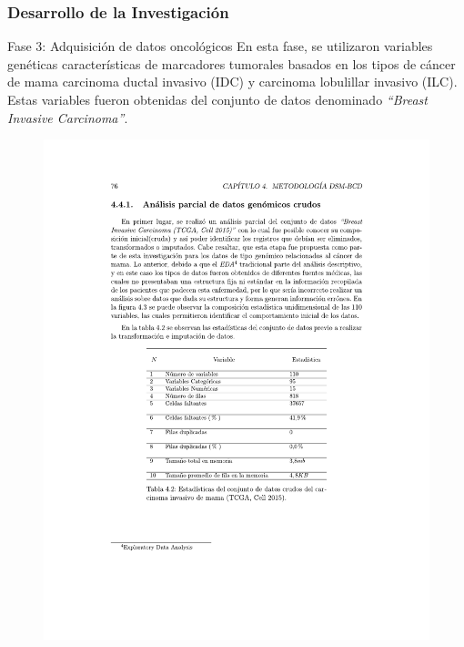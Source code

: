 \documentclass[xcolor=dvipsnames,xcolor=table,10pt]{beamer} %
\begin{document}
\begin{frame}
	\frametitle{Desarrollo de la Investigación}
	\begin{block}{Fase 3: Adquisición de datos oncológicos}\justifying
	En esta fase, se utilizaron variables genéticas características de marcadores tumorales basados en los tipos de cáncer de mama carcinoma ductal invasivo (IDC) y carcinoma lobulillar invasivo (ILC). Estas variables fueron obtenidas del conjunto de datos denominado \textit{“Breast Invasive Carcinoma”}.
	\end{block}
	
	\begin{figure}[h!]
		\centering
		\includegraphics[width=0.55\linewidth]{IMAGENES/Adquisicion_datos}
	\end{figure}
\end{frame}
\end{document}
